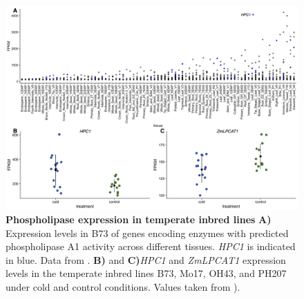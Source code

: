 \documentclass[9pt,twocolumn,twoside,lineno]{biorxiv}
\newcommand{\hpc}{\textit{HPC1}\xspace}
\begin{document}
\begin{figure}[t]
\begin{center}
\includegraphics[width=0.8\paperwidth]{Sup_Figures/Sup_Fig_4.png}
\caption{\textbf{Phospholipase expression in temperate inbred lines} \textbf{A)} Expression levels in B73 of genes encoding enzymes with predicted phospholipase A1 activity across different tissues. \hpc is indicated in blue. 
Data from \cite{Stelpflug2016-vr}.
\textbf{B)}  and \textbf{C)}\hpc and \textit{ZmLPCAT1} expression levels in the temperate inbred lines B73, Mo17, OH43, and PH207 under cold and control conditions. Values taken from \cite{Waters2017-nat}).
}
\label{figure:Sup:B73_expression}
\end{center}
\end{figure} 

\clearpage
\end{document}
